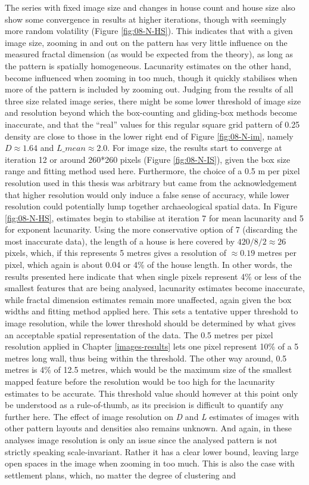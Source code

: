 \documentclass[
  12pt,
  a4paper, twoside]{book}
\begin{document}
The series with fixed image size and changes in house count and house size also show some convergence in results at higher iterations, though with seemingly more random volatility (Figure \ref{fig:08-N-HS}). This indicates that with a given image size, zooming in and out on the pattern has very little influence on the measured fractal dimension (as would be expected from the theory), as long as the pattern is spatially homogeneous. Lacunarity estimates on the other hand, become influenced when zooming in too much, though it quickly stabilises when more of the pattern is included by zooming out. Judging from the results of all three size related image series, there might be some lower threshold of image size and resolution beyond which the box-counting and gliding-box methods become inaccurate, and that the ``real'' values for this regular square grid pattern of 0.25 density are close to those in the lower right end of Figure \ref{fig:08-N-im}, namely \(D \approx 1.64\) and \(L\_mean\approx 2.0\). For image size, the results start to converge at iteration 12 or around 260*260 pixels (Figure \ref{fig:08-N-IS}), given the box size range and fitting method used here. Furthermore, the choice of a 0.5 m per pixel resolution used in this thesis was arbitrary but came from the acknowledgement that higher resolution would only induce a false sense of accuracy, while lower resolution could potentially lump together archaeological spatial data. In Figure \ref{fig:08-N-HS}, estimates begin to stabilise at iteration 7 for mean lacunarity and 5 for exponent lacunarity. Using the more conservative option of 7 (discarding the most inaccurate data), the length of a house is here covered by \(420/8/2 \approx 26\) pixels, which, if this represents 5 metres gives a resolution of \(\approx 0.19\) metres per pixel, which again is about 0.04 or 4\% of the house length. In other words, the results presented here indicate that when single pixels represent 4\% or less of the smallest features that are being analysed, lacunarity estimates become inaccurate, while fractal dimension estimates remain more unaffected, again given the box widths and fitting method applied here. This sets a tentative upper threshold to image resolution, while the lower threshold should be determined by what gives an acceptable spatial representation of the data. The 0.5 metres per pixel resolution applied in Chapter \ref{images-results} lets one pixel represent 10\% of a 5 metres long wall, thus being within the threshold. The other way around, 0.5 metres is 4\% of 12.5 metres, which would be the maximum size of the smallest mapped feature before the resolution would be too high for the lacunarity estimates to be accurate. This threshold value should however at this point only be understood as a rule-of-thumb, as its precision is difficult to quantify any further here. The effect of image resolution on \emph{D} and \emph{L} estimates of images with other pattern layouts and densities also remains unknown. And again, in these analyses image resolution is only an issue since the analysed pattern is not strictly speaking scale-invariant. Rather it has a clear lower bound, leaving large open spaces in the image when zooming in too much. This is also the case with settlement plans, which, no matter the degree of clustering and 
\end{document}
